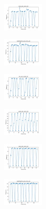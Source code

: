 \begin{figure}[H]
\begin{subfigure}
        \centering
        \includegraphics[width=0.234\textwidth]{img/ils-es/rand_set_const_20_277451237_time.png}
    \end{subfigure}
    \hfill
    \begin{subfigure}
        \centering
        \includegraphics[width=0.234\textwidth]{img/ils-es/newthyroid_set_const_20_277451237_time.png}
    \end{subfigure}
    \hfill
    \begin{subfigure}
        \centering
        \includegraphics[width=0.234\textwidth]{img/ils-es/iris_set_const_20_49258669_time.png}
    \end{subfigure}
    \hfill
    \begin{subfigure}
        \centering
        \includegraphics[width=0.234\textwidth]{img/ils-es/ecoli_set_const_20_49258669_time.png}
    \end{subfigure}
    \hfill
    \begin{subfigure}
        \centering
        \includegraphics[width=0.234\textwidth]{img/ils-es/rand_set_const_20_49258669_time.png}
    \end{subfigure}
    \hfill
    \begin{subfigure}
        \centering
        \includegraphics[width=0.234\textwidth]{img/ils-es/newthyroid_set_const_20_49258669_time.png}

\end{subfigure}
\end{figure}
